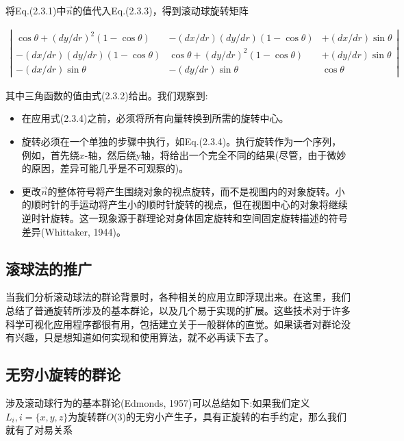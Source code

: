 \begin{CJK}{UTF8}{gbsn}
将Eq.(2.3.1)中$\vec{n}$的值代入Eq.(2.3.3)，得到滚动球旋转矩阵

\begin{align}
\left|\begin{array}{ccc}
\cos \theta+(d y / d r)^{2}(1-\cos \theta) & -(d x / d r)(d y / d r)(1-\cos \theta) & +(d x / d r) \sin \theta \\
-(d x / d r)(d y / d r)(1-\cos \theta) & \cos \theta+(d y / d r)^{2}(1-\cos \theta) & +(d y / d r) \sin \theta \\
-(d x / d r) \sin \theta & -(d y / d r) \sin \theta & \cos \theta
\end{array}\right|
\end{align}



其中三角函数的值由式(2.3.2)给出。我们观察到:

\begin{itemize}
\item 在应用式(2.3.4)之前，必须将所有向量转换到所需的旋转中心。


\item 旋转必须在一个单独的步骤中执行，如Eq.(2.3.4)。执行旋转作为一个序列，例如，首先绕$x$-轴，然后绕y轴，将给出一个完全不同的结果(尽管，由于微妙的原因，差异可能几乎是不可观察的)。


\item 更改$\vec{n}$的整体符号将产生围绕对象的视点旋转，而不是视图内的对象旋转。小的顺时针的手运动将产生小的顺时针旋转的视点，但在视图中心的对象将继续逆时针旋转。这一现象源于群理论对身体固定旋转和空间固定旋转描述的符号差异(Whittaker, 1944)。

\end{itemize}

\subsection*{滚球法的推广}
当我们分析滚动球法的群论背景时，各种相关的应用立即浮现出来。在这里，我们总结了普通旋转所涉及的基本群论，以及几个易于实现的扩展。这些技术对于许多科学可视化应用程序都很有用，包括建立关于一般群体的直觉。如果读者对群论没有兴趣，只是想知道如何实现和使用算法，就不必再读下去了。

\subsection*{无穷小旋转的群论}
涉及滚动球行为的基本群论(Edmonds, 1957)可以总结如下:如果我们定义$L_{i}, i=\{x, y, z\}$为旋转群$O$(3)的无穷小产生子，具有正旋转的右手约定，那么我们就有了对易关系


\end{CJK}
